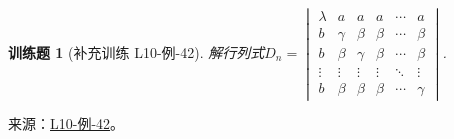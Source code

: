 \documentclass[UTF8,12pt,a4paper,fontset=fandol]{ctexart}
\newtheorem{exercise}{训练题}[section]
\begin{document}
\begin{exercise}[补充训练 L10-例-42]\label{prob:L10-例-42}
解行列式$D_n=\begin{vmatrix}
                    \lambda & a      & a      & a      & \cdots & a      \\
                    b       & \gamma & \beta  & \beta  & \cdots & \beta  \\
                    b       & \beta  & \gamma & \beta  & \cdots & \beta  \\
                    \vdots  & \vdots & \vdots & \vdots & \ddots & \vdots \\
                    b       & \beta  & \beta  & \beta  & \cdots & \gamma
                \end{vmatrix}$.
\end{exercise}
\noindent 来源：\href{https://github.com/yhwu-is/Linear-Algebra-Left-Undone/blob/new/%E8%AE%B2%E4%B9%89/%E4%B8%93%E9%A2%98/10%20%E8%A1%8C%E5%88%97%E5%BC%8F.tex}{L10-例-42}。
\end{document}
